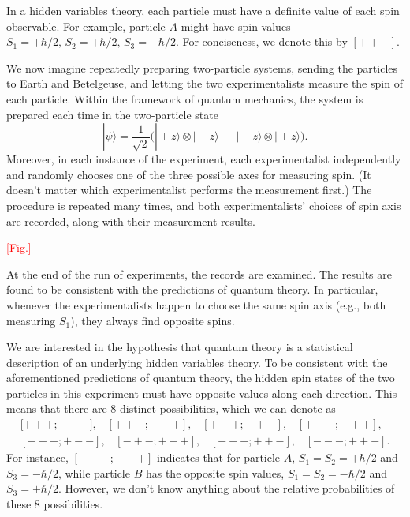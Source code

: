 \documentclass[pra,11pt]{revtex4}
\begin{document}
In a hidden variables theory, each particle must have a definite value
of each spin observable.  For example, particle $A$ might have spin
values $S_1 = +\hbar/2, \, S_2 = +\hbar/2, \, S_3 = -\hbar/2$.  For
conciseness, we denote this by $[++-]$.

We now imagine repeatedly preparing two-particle systems, sending the
particles to Earth and Betelgeuse, and letting the two
experimentalists measure the spin of each particle.  Within the
framework of quantum mechanics, the system is prepared each time in
the two-particle state
$$|\psi\rangle = \frac{1}{\sqrt{2}} \Big(|\!+\!z\rangle\otimes|\!-\!z\rangle \,-\, |\!-\!z\rangle\otimes|\!+\!z\rangle\Big).$$
Moreover, in each instance of the experiment, each experimentalist
independently and randomly chooses one of the three possible axes for
measuring spin.  (It doesn't matter which experimentalist performs the
measurement first.)  The procedure is repeated many times, and both
experimentalists' choices of spin axis are recorded, along with their
measurement results.

\textcolor{red}{[Fig.]}

At the end of the run of experiments, the records are examined.  The
results are found to be consistent with the predictions of quantum
theory.  In particular, whenever the experimentalists happen to
choose the same spin axis (e.g., both measuring $S_1$), they always
find opposite spins.

We are interested in the hypothesis that quantum theory is a
statistical description of an underlying hidden variables theory.  To
be consistent with the aforementioned predictions of quantum theory,
the hidden spin states of the two particles in this experiment must
have opposite values along each direction.  This means that there are
$8$ distinct possibilities, which we can denote as
$$\begin{aligned}{[}{+++};{---}], \;\;\; [{++-};{--+}], \;\;\; [{+-+};{-+-}], \;\;\; [{+--};{-++}],\\ [{-++};{+--}], \;\;\; [{-+-};{+-+}], \;\;\; [{--+};{++-}], \;\;\; [{---};{+++}].\end{aligned}$$
For instance, $[{++-};{--+}]$ indicates that for particle $A$, $S_1 =
S_2 = +\hbar/2$ and $S_3 = -\hbar/2$, while particle $B$ has the
opposite spin values, $S_1 = S_2 = -\hbar/2$ and $S_3 = +\hbar/2$.
However, we don't know anything about the relative probabilities of
these 8 possibilities.
\end{document}
